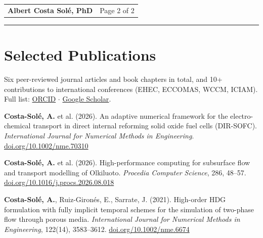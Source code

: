 \documentclass[10pt,a4paper]{article}
\newcommand{\dates}[1]{{\sffamily\fontsize{8.8}{10.5}\selectfont\color{muted}#1}}
\newcommand{\org}[1]{{\color{ink}\textbf{#1}}}
\newcommand{\pubsep}{\par\vspace{3pt}}
\begin{document}
\newpage
\begin{tabularx}{\textwidth}{@{}X r@{}}
  {\sffamily\fontsize{11}{13}\selectfont\bfseries\color{ink}Albert Costa Solé, PhD} & \dates{Page 2 of 2} \\
\end{tabularx}
\vspace{2pt}
{\color{accent}\rule{\textwidth}{1.2pt}}

\section{Selected Publications}

{\sffamily\fontsize{9.5}{11.3}\selectfont\color{muted}
	Six peer-reviewed journal articles and book chapters in total, and 10+
	contributions to international conferences (EHEC, ECCOMAS, WCCM, ICIAM).
	Full list:
	\href{https://orcid.org/0000-0002-3126-0855}
		{\color{accent}ORCID}
	\textcolor{hair}{$\cdot$}
	\href{https://scholar.google.com/citations?user=4sdgN-wAAAAJ&hl=es}
		{\color{accent}Google Scholar}.}

\vspace{4pt}

\org{Costa-Solé, A.} et al. (2026).
An adaptive numerical framework for the electro-chemical transport in direct internal reforming solid oxide fuel cells (DIR-SOFC).
\textit{International Journal for Numerical Methods in Engineering}.
\href{https://doi.org/10.1002/nme.70310}
{\color{accent}doi.org/10.1002/nme.70310}

\pubsep

\org{Costa-Solé, A.} et al. (2026).
High-performance computing for subsurface flow and transport modelling of Olkiluoto.
\textit{Procedia Computer Science}, 286, 48--57.
\href{https://doi.org/10.1016/j.procs.2026.08.018}
{\color{accent}doi.org/10.1016/j.procs.2026.08.018}

\pubsep

\org{Costa-Solé, A.}, Ruiz-Gironés, E., Sarrate, J. (2021).
High-order HDG formulation with fully implicit temporal schemes for the simulation of two-phase flow through porous media.
\textit{International Journal for Numerical Methods in Engineering}, 122(14), 3583--3612.
\href{https://doi.org/10.1002/nme.6674}
{\color{accent}doi.org/10.1002/nme.6674}
\end{document}
